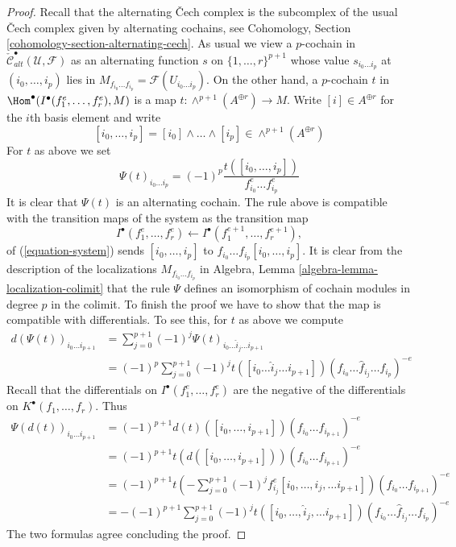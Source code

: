 \begin{proof}
Recall that the alternating {\v C}ech complex is the subcomplex
of the usual {\v C}ech complex given by alternating cochains, see
Cohomology, Section \ref{cohomology-section-alternating-cech}.
As usual we view a $p$-cochain in
$\check{\mathcal{C}}_{alt}^\bullet(\mathcal{U}, \mathcal{F})$
as an alternating function $s$ on $\{1, \ldots, r\}^{p + 1}$
whose value $s_{i_0\ldots i_p}$ at $(i_0, \ldots, i_p)$ lies in
$M_{f_{i_0}\ldots f_{i_p}} = \mathcal{F}(U_{i_0\ldots i_p})$.
On the other hand, a $p$-cochain $t$ in
$\Hom^\bullet(I^\bullet(f_1^e, \ldots, f_r^e), M)$
is a map $t : \wedge^{p + 1}(A^{\oplus r}) \to M$.
Write $[i] \in A^{\oplus r}$ for the $i$th basis element and
write
$$
[i_0, \ldots, i_p] = [i_0] \wedge \ldots \wedge [i_p]
\in \wedge^{p + 1}(A^{\oplus r})
$$
For $t$ as above we set
$$
\Psi(t)_{i_0 \ldots i_p} =
(-1)^p \frac{t([i_0, \ldots, i_p])}{f_{i_0}^e\ldots f_{i_p}^e}
$$
It is clear that $\Psi(t)$ is an alternating cochain.
The rule above is compatible with the transition maps
of the system as the transition map
$$
I^\bullet(f_1^e, \ldots, f_r^e) \leftarrow
I^\bullet(f_1^{e + 1}, \ldots, f_r^{e + 1}),
$$
of (\ref{equation-system}) sends $[i_0, \ldots, i_p]$
to $f_{i_0}\ldots f_{i_p}[i_0, \ldots, i_p]$.
It is clear from the description of the localizations
$M_{f_{i_0} \ldots f_{i_p}}$ in
Algebra, Lemma \ref{algebra-lemma-localization-colimit}
that the rule $\Psi$ defines an isomorphism of cochain modules
in degree $p$ in the colimit. To finish the proof we have to show that the map
is compatible with differentials. To see this, for $t$ as above we compute
\begin{align*}
d(\Psi(t))_{i_0 \ldots i_{p + 1}}
& =
\sum\nolimits_{j = 0}^{p + 1} (-1)^j
\Psi(t)_{i_0\ldots \hat i_j \ldots i_{p + 1}} \\
& =
(-1)^p
\sum\nolimits_{j = 0}^{p + 1} (-1)^j t([i_0 \ldots \hat i_j \ldots i_{p + 1}])
(f_{i_0} \ldots \hat f_{i_j} \ldots f_{i_p})^{-e}
\end{align*}
Recall that the differentials on $I^\bullet(f_1^e, \ldots, f_r^e)$
are the negative of the differentials on $K^\bullet(f_1, \ldots, f_r)$.
Thus
\begin{align*}
\Psi(d(t))_{i_0 \ldots i_{p + 1}} & =
(-1)^{p + 1}
d(t)([i_0, \ldots, i_{p + 1}]) (f_{i_0} \ldots f_{i_{p + 1}})^{-e} \\
& =
(-1)^{p + 1}
t(d([i_0, \ldots, i_{p + 1}])) (f_{i_0} \ldots f_{i_{p + 1}})^{-e} \\
& =
(-1)^{p + 1}
t(-\sum\nolimits_{j = 0}^{p + 1}
(-1)^j f_{i_j}^e [i_0, \ldots, \hat i_j, \ldots i_{p + 1}])
(f_{i_0} \ldots f_{i_{p + 1}})^{-e} \\
& =
-(-1)^{p + 1}
\sum\nolimits_{j = 0}^{p + 1}
(-1)^j t([i_0, \ldots, \hat i_j, \ldots i_{p + 1}])
(f_{i_0} \ldots \hat f_{i_j} \ldots f_{i_p})^{-e}
\end{align*}
The two formulas agree concluding the proof.
\end{proof}

